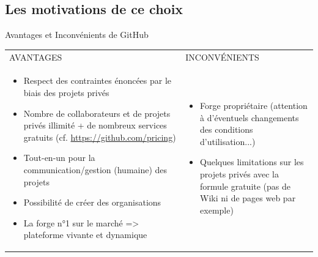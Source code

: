 \documentclass{beamer}
\begin{document}
\subsection{Les motivations de ce choix}
\begin{frame}{Avantages et Inconvénients de GitHub}
\setlength{\arrayrulewidth}{0.5mm}
\tiny
\begin{center}
\begin{tabular}{ | m{20em} | m{20em}| } 
\hline
 \rowcolor{lightgray} \multicolumn{2}{|c|}{\textbf{Analyse de GitHub}} \\
\hline
\cellcolor{green} AVANTAGES & \cellcolor{red} INCONVÉNIENTS \\ 
\hline
\medskip
\begin{itemize}
	\item Respect des contraintes énoncées par le biais des projets privés
    \item Nombre de collaborateurs et de projets privés illimité + de nombreux services 
          gratuits (cf. \url{https://github.com/pricing})
    \item Tout-en-un pour la communication/gestion (humaine) des projets 
    \item Possibilité de créer des organisations
    \item La forge n°1 sur le marché => plateforme vivante et dynamique
\end{itemize} 
& 
\medskip
\begin{itemize}
    \item Forge propriétaire (attention à d'éventuels changements des conditions  
          d'utilisation...)
    \item Quelques limitations sur les projets privés avec la formule gratuite 
          (pas de Wiki ni de pages web par exemple)
\end{itemize} 
\\ 
\hline
\end{tabular}
\end{center}
\bigskip
\normalsize
\end{frame}




\end{document}
